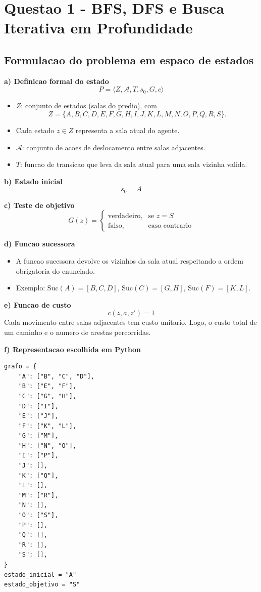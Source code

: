 \section{Questao 1 - BFS, DFS e Busca Iterativa em Profundidade}

\subsection{Formulacao do problema em espaco de estados}
\textbf{a) Definicao formal do estado}
\[
P = \langle Z, \mathcal{A}, T, s_0, G, c \rangle
\]
\begin{itemize}[leftmargin=1.5em]
  \item $Z$: conjunto de estados (salas do predio), com
  \[
  Z=\{A,B,C,D,E,F,G,H,I,J,K,L,M,N,O,P,Q,R,S\}.
  \]
  \item Cada estado $z \in Z$ representa a sala atual do agente.
  \item $\mathcal{A}$: conjunto de acoes de deslocamento entre salas adjacentes.
  \item $T$: funcao de transicao que leva da sala atual para uma sala vizinha valida.
\end{itemize}

\textbf{b) Estado inicial}
\[
s_0 = A
\]

\textbf{c) Teste de objetivo}
\[
G(z)=
\begin{cases}
\text{verdadeiro}, & \text{se } z=S \\
\text{falso}, & \text{caso contrario}
\end{cases}
\]

\textbf{d) Funcao sucessora}
\begin{itemize}[leftmargin=1.5em]
  \item A funcao sucessora devolve os vizinhos da sala atual respeitando a ordem obrigatoria do enunciado.
  \item Exemplo: $\text{Suc}(A)=[B,C,D]$, $\text{Suc}(C)=[G,H]$, $\text{Suc}(F)=[K,L]$.
\end{itemize}

\textbf{e) Funcao de custo}
\[
c(z,a,z') = 1
\]
Cada movimento entre salas adjacentes tem custo unitario. Logo, o custo total de um caminho e o numero de arestas percorridas.

\textbf{f) Representacao escolhida em Python}
\begin{lstlisting}
grafo = {
    "A": ["B", "C", "D"],
    "B": ["E", "F"],
    "C": ["G", "H"],
    "D": ["I"],
    "E": ["J"],
    "F": ["K", "L"],
    "G": ["M"],
    "H": ["N", "O"],
    "I": ["P"],
    "J": [],
    "K": ["Q"],
    "L": [],
    "M": ["R"],
    "N": [],
    "O": ["S"],
    "P": [],
    "Q": [],
    "R": [],
    "S": [],
}
estado_inicial = "A"
estado_objetivo = "S"
\end{lstlisting}

